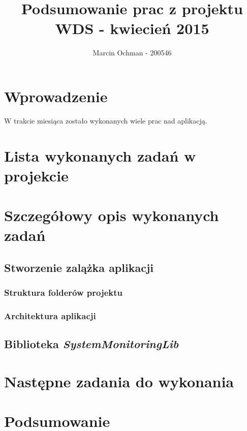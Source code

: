 \documentclass[a4paper]{article}
\title{\textbf{Podsumowanie prac z projektu WDS - kwiecień 2015}}
\author{Marcin Ochman - 200546}
\date{}
\begin{document}


\newpage

\tableofcontents
\listoffigures
\listoftables

\newpage

\section{Wprowadzenie}

W trakcie miesiąca zostało wykonanych wiele prac nad aplikacją.


\section{Lista wykonanych zadań w projekcie}

\section{Szczegółowy opis wykonanych zadań}

\subsection{Stworzenie zalążka aplikacji}

\subsubsection{Struktura folderów projektu}
\subsubsection{Architektura aplikacji}

\subsection{Biblioteka \textit{SystemMonitoringLib}}

\section{Następne zadania do wykonania}

\section{Podsumowanie}
\end{document}
